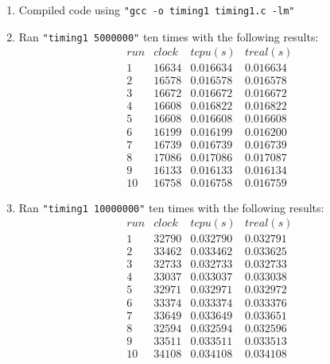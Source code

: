 \documentclass[12pt,fleqn,leqno,letterpaper]{article}
\begin{document}
\begin{enumerate}
    \item Compiled code using \texttt{"gcc -o timing1 timing1.c -lm"}

    \item Ran \texttt{"timing1 5000000"} ten times with the following results:\\
        $$
        \begin{array}{lccc}
            run & clock & t cpu (s) & t real (s) \\
            1 & 16634 & 0.016634 & 0.016634 \\
            2 & 16578 & 0.016578 & 0.016578 \\
            3 & 16672 & 0.016672 & 0.016672 \\
            4 & 16608 & 0.016822 & 0.016822 \\
            5 & 16608 & 0.016608 & 0.016608 \\
            6 & 16199 & 0.016199 & 0.016200 \\
            7 & 16739 & 0.016739 & 0.016739 \\
            8 & 17086 & 0.017086 & 0.017087 \\
            9 & 16133 & 0.016133 & 0.016134 \\
            10 & 16758 & 0.016758 & 0.016759
        \end{array}
        $$

    \item Ran \texttt{"timing1 10000000"} ten times with the following
        results:\\
        $$
        \begin{array}{lccc}
            run & clock & t cpu (s) & t real (s) \\
            1 & 32790 & 0.032790 & 0.032791 \\
            2 & 33462 & 0.033462 & 0.033625 \\
            3 & 32733 & 0.032733 & 0.032733 \\
            4 & 33037 & 0.033037 & 0.033038\\
            5 & 32971 & 0.032971 & 0.032972 \\
            6 & 33374 & 0.033374 & 0.033376 \\
            7 & 33649 & 0.033649 & 0.033651 \\
            8 & 32594 & 0.032594 & 0.032596 \\
            9 & 33511 & 0.033511 & 0.033513 \\
            10 & 34108 & 0.034108 & 0.034108
        \end{array}
        $$


\end{enumerate}
\end{document}
